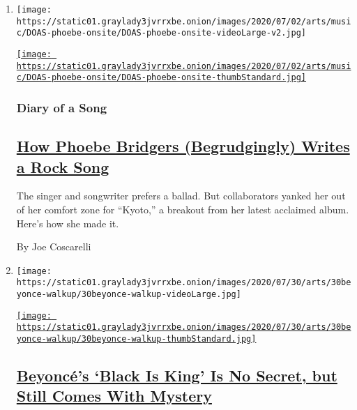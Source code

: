 \begin{enumerate}
\def\labelenumi{\arabic{enumi}.}
\item
  \texttt{[image: https://static01.graylady3jvrrxbe.onion/images/2020/07/02/arts/music/DOAS-phoebe-onsite/DOAS-phoebe-onsite-videoLarge-v2.jpg]}

  \href{/2020/07/30/arts/music/phoebe-bridgers-kyoto.html}{\texttt{[image: https://static01.graylady3jvrrxbe.onion/images/2020/07/02/arts/music/DOAS-phoebe-onsite/DOAS-phoebe-onsite-thumbStandard.jpg]}}

  \hypertarget{diary-of-a-song}{%
  \subsubsection{Diary of a Song}\label{diary-of-a-song}}

  \hypertarget{how-phoebe-bridgers-begrudgingly-writes-a-rock-song}{%
  \subsection{\texorpdfstring{\href{/2020/07/30/arts/music/phoebe-bridgers-kyoto.html}{How
  Phoebe Bridgers (Begrudgingly) Writes a Rock
  Song}}{How Phoebe Bridgers (Begrudgingly) Writes a Rock Song}}\label{how-phoebe-bridgers-begrudgingly-writes-a-rock-song}}

  The singer and songwriter prefers a ballad. But collaborators yanked
  her out of her comfort zone for ``Kyoto,'' a breakout from her latest
  acclaimed album. Here's how she made it.

  By Joe Coscarelli
\item
  \texttt{[image: https://static01.graylady3jvrrxbe.onion/images/2020/07/30/arts/30beyonce-walkup/30beyonce-walkup-videoLarge.jpg]}

  \href{/2020/07/30/arts/music/beyonce-black-is-king.html}{\texttt{[image: https://static01.graylady3jvrrxbe.onion/images/2020/07/30/arts/30beyonce-walkup/30beyonce-walkup-thumbStandard.jpg]}}

  \hypertarget{beyoncuxe9s-black-is-king-is-no-secret-but-still-comes-with-mystery}{%
  \subsection{\texorpdfstring{\href{/2020/07/30/arts/music/beyonce-black-is-king.html}{Beyoncé's
  `Black Is King' Is No Secret, but Still Comes With
  Mystery}}{Beyoncé's `Black Is King' Is No Secret, but Still Comes With Mystery}}\label{beyoncuxe9s-black-is-king-is-no-secret-but-still-comes-with-mystery}}


\end{enumerate}
